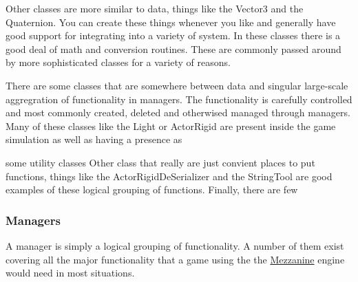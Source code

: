 Other classes are more similar to data, things like the Vector3 and the Quaternion. You can create these things whenever you like and generally have good support for integrating into a variety of system. In these classes there is a good deal of math and conversion routines. These are commonly passed around by more sophisticated classes for a variety of reasons.

There are some classes that are somewhere between data and singular large-\/scale aggregration of functionality in managers. The functionality is carefully controlled and most commonly created, deleted and otherwised managed through managers. Many of these classes like the Light or ActorRigid are present inside the game simulation as well as having a presence as

some utility classes Other class that really are just convient places to put functions, things like the ActorRigidDeSerializer and the StringTool are good examples of these logical grouping of functions. Finally, there are few\hypertarget{index_Managers}{}\subsubsection{Managers}\label{index_Managers}
A manager is simply a logical grouping of functionality. A number of them exist covering all the major functionality that a game using the the \hyperlink{namespaceMezzanine}{Mezzanine} engine would need in most situations.

